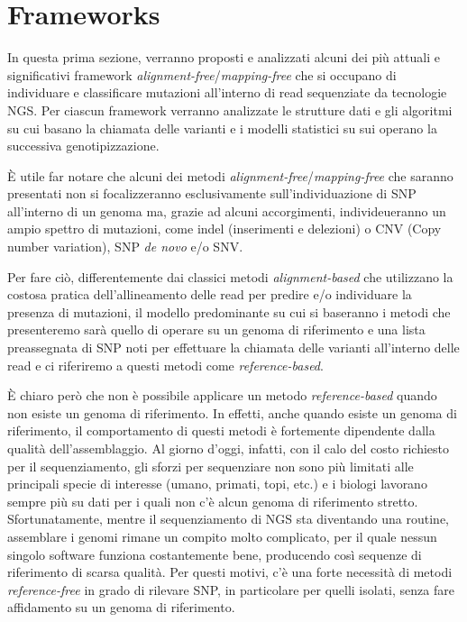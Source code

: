 \documentclass[../main.tex]{subfiles}
\begin{document}
\section{Frameworks}
\label{frameworks}

In questa prima sezione, verranno proposti e analizzati alcuni dei più attuali e significativi framework \textit{alignment-free}/\textit{mapping-free} che si occupano di individuare e classificare mutazioni all'interno di read sequenziate da tecnologie NGS. Per ciascun framework verranno analizzate le strutture dati e gli algoritmi su cui basano la chiamata delle varianti e i modelli statistici su sui operano la successiva genotipizzazione.

È utile far notare che alcuni dei metodi \textit{alignment-free}/\textit{mapping-free} che saranno presentati non si focalizzeranno esclusivamente sull'individuazione di SNP all'interno di un genoma ma, grazie ad alcuni accorgimenti, individeueranno un ampio spettro di mutazioni, come indel (inserimenti e delezioni) o CNV (Copy number variation), SNP \textit{de novo} e/o SNV. 


Per fare ciò, differentemente dai classici metodi \textit{alignment-based} che utilizzano la costosa pratica dell'allineamento delle read per predire e/o individuare la presenza di mutazioni, il modello predominante su cui si baseranno i metodi che presenteremo sarà quello di operare su un genoma di riferimento e una lista preassegnata di SNP noti per effettuare la chiamata delle varianti all'interno delle read e ci riferiremo a questi metodi come \textit{reference-based}. 

È chiaro però che non è possibile applicare un metodo \textit{reference-based} quando non esiste un genoma di riferimento. In effetti, anche quando esiste un genoma di riferimento, il comportamento di questi metodi è fortemente dipendente dalla qualità dell'assemblaggio. Al giorno d'oggi, infatti, con il calo del costo richiesto per il sequenziamento, gli sforzi per sequenziare non sono più limitati alle principali specie di interesse (umano, primati, topi, etc.) e i biologi lavorano sempre più su dati per i quali non c'è alcun genoma di riferimento stretto. Sfortunatamente, mentre il sequenziamento di NGS sta diventando una routine, assemblare i genomi rimane un compito molto complicato, per il quale nessun singolo software funziona costantemente bene, producendo così sequenze di riferimento di scarsa qualità. Per questi motivi, c'è una forte necessità di metodi \textit{reference-free} in grado di rilevare SNP, in particolare per quelli isolati, senza fare affidamento su un genoma di riferimento.
\end{document}
